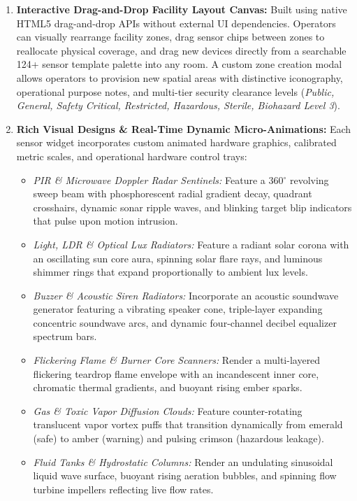 \documentclass[12pt,a4paper]{article}
\begin{document}
\begin{enumerate}
    \item \textbf{Interactive Drag-and-Drop Facility Layout Canvas:} Built using native HTML5 drag-and-drop APIs without external UI dependencies. Operators can visually rearrange facility zones, drag sensor chips between zones to reallocate physical coverage, and drag new devices directly from a searchable 124+ sensor template palette into any room. A custom zone creation modal allows operators to provision new spatial areas with distinctive iconography, operational purpose notes, and multi-tier security clearance levels (\textit{Public, General, Safety Critical, Restricted, Hazardous, Sterile, Biohazard Level 3}).
    
    \item \textbf{Rich Visual Designs \& Real-Time Dynamic Micro-Animations:} Each sensor widget incorporates custom animated hardware graphics, calibrated metric scales, and operational hardware control trays:
    \begin{itemize}
        \item \textit{PIR \& Microwave Doppler Radar Sentinels:} Feature a 360$^\circ$ revolving sweep beam with phosphorescent radial gradient decay, quadrant crosshairs, dynamic sonar ripple waves, and blinking target blip indicators that pulse upon motion intrusion.
        \item \textit{Light, LDR \& Optical Lux Radiators:} Feature a radiant solar corona with an oscillating sun core aura, spinning solar flare rays, and luminous shimmer rings that expand proportionally to ambient lux levels.
        \item \textit{Buzzer \& Acoustic Siren Radiators:} Incorporate an acoustic soundwave generator featuring a vibrating speaker cone, triple-layer expanding concentric soundwave arcs, and dynamic four-channel decibel equalizer spectrum bars.
        \item \textit{Flickering Flame \& Burner Core Scanners:} Render a multi-layered flickering teardrop flame envelope with an incandescent inner core, chromatic thermal gradients, and buoyant rising ember sparks.
        \item \textit{Gas \& Toxic Vapor Diffusion Clouds:} Feature counter-rotating translucent vapor vortex puffs that transition dynamically from emerald (safe) to amber (warning) and pulsing crimson (hazardous leakage).
        \item \textit{Fluid Tanks \& Hydrostatic Columns:} Render an undulating sinusoidal liquid wave surface, buoyant rising aeration bubbles, and spinning flow turbine impellers reflecting live flow rates.

\end{itemize}
\end{enumerate}
\end{document}
